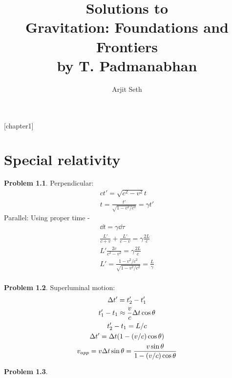 \documentclass{report}
\theoremstyle{definition}
\begin{document}
\title{Solutions to \\ Gravitation: Foundations and Frontiers \\ by T. Padmanabhan}

\author{Arjit Seth}
\date{}

\maketitle

\newtheorem{chapter1}{Problem}
[chapter1]

\chapter{Special relativity}

\begin{chapter1}\label{prob:1}
	Perpendicular:
	\begin{gather*}
		ct' = \sqrt{c^2 - v^2}t \\
		t = \frac{t'}{\sqrt{1 - v^2/c^2}} = \gamma t'
	\end{gather*}
	Parallel: Using proper time -
	\begin{gather*}
		\dd{t} = \gamma\dd{\tau} \\ 
		\frac{L'}{c+v} + \frac{L'}{c-v} = \gamma\frac{2L}{c} \\
		L'\frac{2c}{c^2 - v^2}  = \gamma\frac{2L}{c} \\
		L' = \frac{1-v^2/c^2}{\sqrt{1-v^2/c^2}} = \frac{L}{\gamma} \\
	\end{gather*}
\end{chapter1}

\begin{chapter1}\label{prob:2}
	Superluminal motion:
	\begin{gather*}
		\Delta t' = t_2' - t_1' \\
		t_1' - t_1 \approx \frac{v}{c}\Delta t \cos\theta \\
		t_2' - t_1 = L/c \\
		\Delta t' = \Delta t\pqty{1-(v/c)\cos\theta} \\
		v_{app} = v\Delta t \sin\theta = \frac{v\sin\theta}{1-(v/c)\cos\theta}
	\end{gather*}
\end{chapter1}

\begin{chapter1}\label{prob:3}

\end{chapter1}
\end{document}

